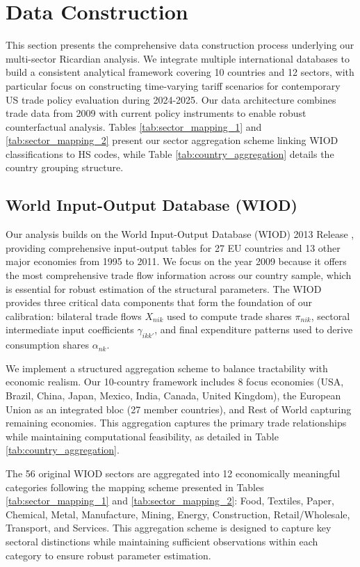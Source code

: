\section{Data Construction}

This section presents the comprehensive data construction process underlying our multi-sector Ricardian analysis. We integrate multiple international databases to build a consistent analytical framework covering 10 countries and 12 sectors, with particular focus on constructing time-varying tariff scenarios for contemporary US trade policy evaluation during 2024-2025. Our data architecture combines trade data from 2009 with current policy instruments to enable robust counterfactual analysis. Tables \ref{tab:sector_mapping_1} and \ref{tab:sector_mapping_2} present our sector aggregation scheme linking WIOD classifications to HS codes, while Table \ref{tab:country_aggregation} details the country grouping structure.

\subsection{World Input-Output Database (WIOD)}

Our analysis builds on the World Input-Output Database (WIOD) 2013 Release \citep{timmer2015illustrated}, providing comprehensive input-output tables for 27 EU countries and 13 other major economies from 1995 to 2011. We focus on the year 2009 because it offers the most comprehensive trade flow information across our country sample, which is essential for robust estimation of the structural parameters. The WIOD provides three critical data components that form the foundation of our calibration: bilateral trade flows $X_{nik}$ used to compute trade shares $\pi_{nik}$, sectoral intermediate input coefficients $\gamma_{ikk'}$, and final expenditure patterns used to derive consumption shares $\alpha_{nk}$.

We implement a structured aggregation scheme to balance tractability with economic realism. Our 10-country framework includes 8 focus economies (USA, Brazil, China, Japan, Mexico, India, Canada, United Kingdom), the European Union as an integrated bloc (27 member countries), and Rest of World capturing remaining economies. This aggregation captures the primary trade relationships while maintaining computational feasibility, as detailed in Table \ref{tab:country_aggregation}. 

The 56 original WIOD sectors are aggregated into 12 economically meaningful categories following the mapping scheme presented in Tables \ref{tab:sector_mapping_1} and \ref{tab:sector_mapping_2}: Food, Textiles, Paper, Chemical, Metal, Manufacture, Mining, Energy, Construction, Retail/Wholesale, Transport, and Services. This aggregation scheme is designed to capture key sectoral distinctions while maintaining sufficient observations within each category to ensure robust parameter estimation.

